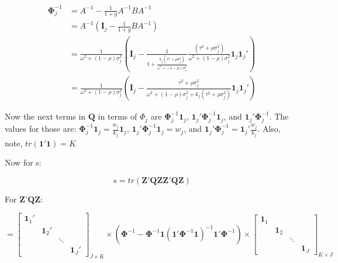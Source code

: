 \begin{equation}
    \begin{split}
        \mathbf{\Phi}_j^{-1} & = A^{-1} - \frac{1}{1+g}A^{-1}BA^{-1} \\
        & = A^{-1}(\mathbf{I}_j - \frac{1}{1+g}BA^{-1}) \\
        & = \frac{1}{\omega^2 +(1-\rho)\sigma^2_j}(\mathbf{I}_j - \frac{1}{1+\frac{k_j(\tau^2 + \rho\sigma^2_j)}{\omega^2 +(1-\rho)\sigma^2_j}}\frac{(\tau^2 + \rho\sigma^2_j)}{\omega^2 +(1-\rho)\sigma^2_j}\mathbf{1}_j\mathbf{1}_j')  \\
        & = \frac{1}{\omega^2 +(1-\rho)\sigma^2_j}(\mathbf{I}_j - \frac{\tau^2 + \rho\sigma^2_j}{\omega^2 +(1-\rho)\sigma^2_j+k_j(\tau^2 + \rho\sigma^2_j)}\mathbf{1}_j\mathbf{1}_j') 
    \end{split}
\end{equation}

Now the next terms in $\mathbf{Q}$ in terms of $\Phi_j$ are $\mathbf{\Phi}_j^{-1}\mathbf{1}_j$,  $\mathbf{1}_j'\mathbf{\Phi}_j^{-1}\mathbf{1}_j$, and $\mathbf{1}_j'\mathbf{\Phi}_j^{-1}$. The values for those are: $\mathbf{\Phi}_j^{-1}\mathbf{1}_j = \frac{w_j}{k_j}\mathbf{1}_j $,  $\mathbf{1}_j'\mathbf{\Phi}_j^{-1}\mathbf{1}_j = w_j$, and $\mathbf{1}_j'\mathbf{\Phi}_j^{-1} = \mathbf{1}_j'\frac{w_j}{k_j}$. Also, note, $tr(\mathbf{1}'\mathbf{1})= K$



Now for s:

\begin{equation}
    s = tr(\mathbf{Z}'\mathbf{Q}\mathbf{Z}\mathbf{Z}'\mathbf{Q}\mathbf{Z}) 
    \nonumber
\end{equation}


For $\mathbf{Z}'\mathbf{Q}\mathbf{Z}$:


\begin{equation}
   = \begin{bmatrix}
        \mathbf{1}_1' & & & \\
         & \mathbf{1}_2' & &\\
         & & \ddots &  \\
         & &  & \mathbf{1}_J'
    \end{bmatrix}_{J \times K} \times (\mathbf{\Phi}^{-1}- \mathbf{\Phi}^{-1}\mathbf{1}(\mathbf{1}'\mathbf{\Phi}^{-1}\mathbf{1})^{-1}\mathbf{1}'\mathbf{\Phi}^{-1}) \times
   \begin{bmatrix}
        \mathbf{1}_1 & & & \\
         & \mathbf{1}_2 & &\\
         & & \ddots &  \\
         & &  & \mathbf{1}_J
    \end{bmatrix}_{K \times J}
    \nonumber
\end{equation}


